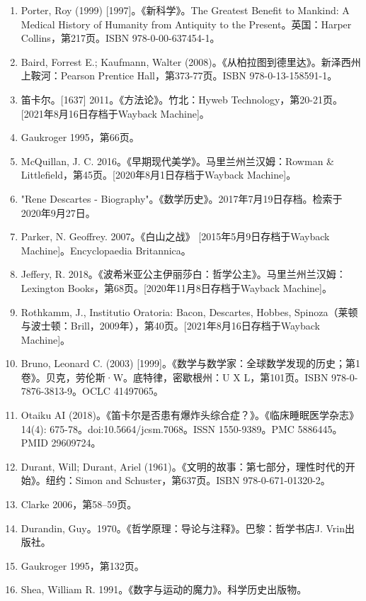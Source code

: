 \begin{enumerate}
\item Porter, Roy (1999) [1997]。《新科学》。The Greatest Benefit to Mankind: A Medical History of Humanity from Antiquity to the Present。英国：Harper Collins，第217页。ISBN 978-0-00-637454-1。
\item Baird, Forrest E.; Kaufmann, Walter (2008)。《从柏拉图到德里达》。新泽西州上鞍河：Pearson Prentice Hall，第373-77页。ISBN 978-0-13-158591-1。
\item 笛卡尔。[1637] 2011。《方法论》。竹北：Hyweb Technology，第20-21页。[2021年8月16日存档于Wayback Machine]。
\item Gaukroger 1995，第66页。
\item McQuillan, J. C. 2016。《早期现代美学》。马里兰州兰汉姆：Rowman & Littlefield，第45页。[2020年8月1日存档于Wayback Machine]。
\item "Rene Descartes - Biography"。《数学历史》。2017年7月19日存档。检索于2020年9月27日。
\item Parker, N. Geoffrey. 2007。《白山之战》 [2015年5月9日存档于Wayback Machine]。Encyclopaedia Britannica。
\item Jeffery, R. 2018。《波希米亚公主伊丽莎白：哲学公主》。马里兰州兰汉姆：Lexington Books，第68页。[2020年11月8日存档于Wayback Machine]。
\item Rothkamm, J., Institutio Oratoria: Bacon, Descartes, Hobbes, Spinoza（莱顿与波士顿：Brill，2009年），第40页。[2021年8月16日存档于Wayback Machine]。
\item Bruno, Leonard C. (2003) [1999]。《数学与数学家：全球数学发现的历史；第1卷》。贝克，劳伦斯·W。底特律，密歇根州：U X L，第101页。ISBN 978-0-7876-3813-9。OCLC 41497065。
\item Otaiku AI (2018)。《笛卡尔是否患有爆炸头综合症？》。《临床睡眠医学杂志》14(4): 675-78。doi:10.5664/jcsm.7068。ISSN 1550-9389。PMC 5886445。PMID 29609724。
\item Durant, Will; Durant, Ariel (1961)。《文明的故事：第七部分，理性时代的开始》。纽约：Simon and Schuster，第637页。ISBN 978-0-671-01320-2。
\item Clarke 2006，第58–59页。

\item Durandin, Guy。1970。《哲学原理：导论与注释》。巴黎：哲学书店J. Vrin出版社。

\item Gaukroger 1995，第132页。

\item Shea, William R. 1991。《数字与运动的魔力》。科学历史出版物。


\end{enumerate}
